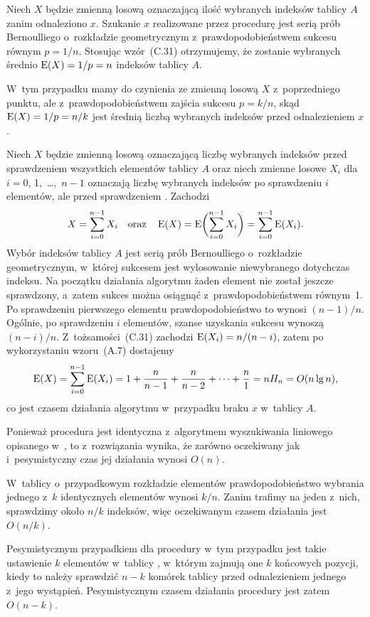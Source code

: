 \subproblem %
Niech $X$ będzie zmienną losową oznaczającą ilość wybranych indeksów tablicy $A$ zanim odnaleziono $x$. Szukanie $x$ realizowane przez procedurę  jest serią prób Bernoulliego o~rozkładzie geometrycznym z~prawdopodobieństwem sukcesu równym $p=1/n$. Stosując wzór~(C.31) otrzymujemy, że zostanie wybranych średnio $\operatorname{E}(X)=1/p=n$ indeksów tablicy $A$.

\subproblem %
W~tym przypadku mamy do czynienia ze zmienną losową $X$ z~poprzedniego punktu, ale z~prawdopodobieństwem zajścia sukcesu $p=k/n$, skąd $\operatorname{E}(X)=1/p=n/k$ jest średnią liczbą wybranych indeksów przed odnalezieniem $x$.

\subproblem %
Niech $X$ będzie zmienną losową oznaczającą liczbę wybranych indeksów przed sprawdzeniem wszystkich elementów tablicy $A$ oraz niech zmienne losowe $X_i$ dla $i=0$, 1,~\dots,~$n-1$ oznaczają liczbę wybranych indeksów po sprawdzeniu $i$ elementów, ale przed sprawdzeniem . Zachodzi
\[
	X = \sum_{i=0}^{n-1}X_i \quad\text{oraz}\quad \operatorname{E}(X) = \operatorname{E}\biggl(\sum_{i=0}^{n-1}X_i\biggr) = \sum_{i=0}^{n-1}\operatorname{E}(X_i).
\]
Wybór indeksów tablicy $A$ jest serią prób Bernoulliego o~rozkładzie geometrycznym, w~której sukcesem jest wylosowanie niewybranego dotychczas indeksu. Na początku działania algorytmu żaden element nie został jeszcze sprawdzony, a~zatem sukces można osiągnąć z~prawdopodobieństwem równym~1. Po sprawdzeniu pierwszego elementu prawdopodobieństwo to wynosi $(n-1)/n$. Ogólnie, po sprawdzeniu $i$ elementów, szanse uzyskania sukcesu wynoszą $(n-i)/n$. Z~tożsamości~(C.31) zachodzi $\operatorname{E}(X_i)=n/(n-i)$, zatem po wykorzystaniu wzoru~(A.7) dostajemy
\[
	\operatorname{E}(X) = \sum_{i=0}^{n-1}\operatorname{E}(X_i) = 1+\frac{n}{n-1}+\frac{n}{n-2}+\dots+\frac{n}{1} = nH_n = O(n\lg n),
\]
co jest czasem działania algorytmu  w~przypadku braku $x$ w~tablicy $A$.

\subproblem %
Ponieważ procedura  jest identyczna z~algorytmem wyszukiwania liniowego opisanego w~, to z~rozwiązania  wynika, że zarówno oczekiwany jak i~pesymistyczny czas jej działania wynosi $O(n)$.

\subproblem %
W~tablicy  o~przypadkowym rozkładzie elementów prawdopodobieństwo wybrania jednego z~$k$ identycznych elementów wynosi $k/n$. Zanim trafimy na jeden z~nich, sprawdzimy około $n/k$ indeksów, więc oczekiwanym czasem działania jest $O(n/k)$.

Pesymistycznym przypadkiem dla procedury w~tym przypadku jest takie ustawienie $k$ elementów w~tablicy , w~którym zajmują one $k$ końcowych pozycji, kiedy to należy sprawdzić $n-k$ komórek tablicy przed odnalezieniem jednego z~jego wystąpień. Pesymistycznym czasem działania procedury jest zatem $O(n-k)$.

